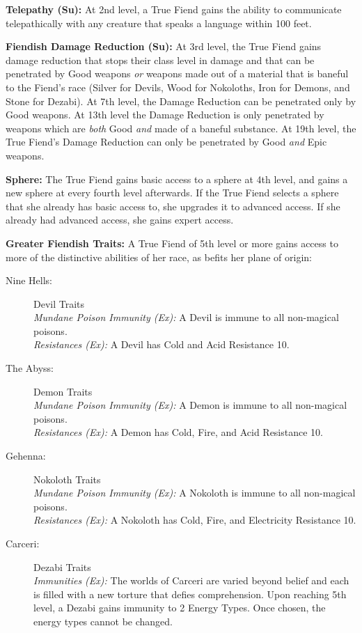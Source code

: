 \textbf{Telepathy (Su):} At 2nd level, a True Fiend gains the ability to communicate telepathically with any creature that speaks a language within 100 feet.

\textbf{Fiendish Damage Reduction (Su):} At 3rd level, the True Fiend gains damage reduction that stops their class level in damage and that can be penetrated by Good weapons \textit{or} weapons made out of a material that is baneful to the Fiend's race (Silver for Devils, Wood for Nokoloths, Iron for Demons, and Stone for Dezabi). At 7th level, the Damage Reduction can be penetrated only by Good weapons. At 13th level the Damage Reduction is only penetrated by weapons which are \textit{both} Good \textit{and} made of a baneful substance. At 19th level, the True Fiend's Damage Reduction can only be penetrated by Good \textit{and} Epic weapons.

\textbf{Sphere:} The True Fiend gains basic access to a sphere at 4th level, and gains a new sphere at every fourth level afterwards. If the True Fiend selects a sphere that she already has basic access to, she upgrades it to advanced access. If she already had advanced access, she gains expert access.

\textbf{Greater Fiendish Traits:} A True Fiend of 5th level or more gains access to more of the distinctive abilities of her race, as befits her plane of origin:

\begin{description}
\item[Nine Hells:] Devil Traits\\
\textit{Mundane Poison Immunity (Ex):} A Devil is immune to all non-magical poisons.\\
\textit{Resistances (Ex):} A Devil has Cold and Acid Resistance 10.

\item[The Abyss:] Demon Traits\\
\textit{Mundane Poison Immunity (Ex):} A Demon is immune to all non-magical poisons.\\
\textit{Resistances (Ex):} A Demon has Cold, Fire, and Acid Resistance 10. 

\item[Gehenna:] Nokoloth Traits\\
\textit{Mundane Poison Immunity (Ex):} A Nokoloth is immune to all non-magical poisons.\\
\textit{Resistances (Ex):} A Nokoloth has Cold, Fire, and Electricity Resistance 10. 

\item[Carceri:] Dezabi Traits\\
\textit{Immunities (Ex):} The worlds of Carceri are varied beyond belief and each is filled with a new torture that defies comprehension. Upon reaching 5th level, a Dezabi gains immunity to 2 Energy Types. Once chosen, the energy types cannot be changed.
\end{description}

